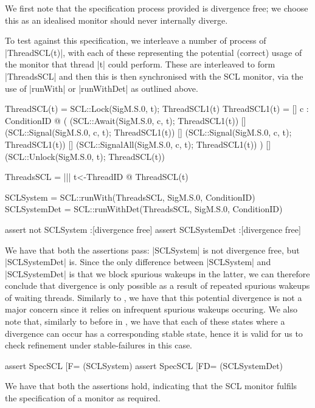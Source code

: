 We first note that the specification process provided is divergence free; we choose this as an idealised monitor should never internally diverge. 

To test against this specification, we interleave a number of process of |ThreadSCL(t)|, with each of these representing the potential (correct) usage of the monitor that thread |t| could perform. These are interleaved to form |ThreadsSCL| and then this is then synchronised with the SCL monitor, via the use of |runWith| or |runWithDet| as outlined above.

\begin{cspm}
ThreadSCL(t) = SCL::Lock(SigM.S.0, t); ThreadSCL1(t)
ThreadSCL1(t) =   
  [] c : ConditionID @ 
     (
          (SCL::Await(SigM.S.0, c, t); ThreadSCL1(t))      
      [] (SCL::Signal(SigM.S.0, c, t); ThreadSCL1(t))
      [] (SCL::Signal(SigM.S.0, c, t); ThreadSCL1(t))
      [] (SCL::SignalAll(SigM.S.0, c, t); ThreadSCL1(t))
     )
  [] (SCL::Unlock(SigM.S.0, t); ThreadSCL(t))

ThreadsSCL = ||| t<-ThreadID @ ThreadSCL(t)

SCLSystem = SCL::runWith(ThreadsSCL, SigM.S.0, ConditionID)
SCLSystemDet = SCL::runWithDet(ThreadsSCL, SigM.S.0, ConditionID)

assert not SCLSystem :[divergence free]
assert SCLSystemDet :[divergence free]
\end{cspm}

We have that both the assertions pass: |SCLSystem| is not divergence free, but |SCLSystemDet| is. Since the only difference between |SCLSystem| and |SCLSystemDet| is that we block spurious wakeups in the latter, we can therefore conclude that divergence is only possible as a result of repeated spurious wakeups of waiting threads. Similarly to , we have that this potential divergence is not a major concern since it relies on infrequent spurious wakeups occuring. We also note that, similarly to before in , we have that each of these states where a divergence can occur has a corresponding stable state, hence it is valid for us to check refinement under stable-failures in this case.

\begin{cspm}
  assert SpecSCL [F= (SCLSystem) 
  assert SpecSCL [FD= (SCLSystemDet)
\end{cspm}

We have that both the assertions hold, indicating that the SCL monitor fulfils the specification of a monitor as required.

